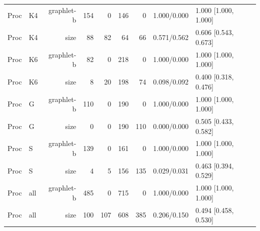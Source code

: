 \begin{tabular}{@{}llrrrrrrl@{}}
\midrule
Proc & K4 & graphlet-b & 154 & 0 & 146 & 0 & 1.000/0.000 & 1.000 [1.000, 1.000] \\
Proc & K4 & size & 88 & 82 & 64 & 66 & 0.571/0.562 & 0.606 [0.543, 0.673] \\
Proc & K6 & graphlet-b & 82 & 0 & 218 & 0 & 1.000/0.000 & 1.000 [1.000, 1.000] \\
Proc & K6 & size & 8 & 20 & 198 & 74 & 0.098/0.092 & 0.400 [0.318, 0.476] \\
Proc & G & graphlet-b & 110 & 0 & 190 & 0 & 1.000/0.000 & 1.000 [1.000, 1.000] \\
Proc & G & size & 0 & 0 & 190 & 110 & 0.000/0.000 & 0.505 [0.433, 0.582] \\
Proc & S & graphlet-b & 139 & 0 & 161 & 0 & 1.000/0.000 & 1.000 [1.000, 1.000] \\
Proc & S & size & 4 & 5 & 156 & 135 & 0.029/0.031 & 0.463 [0.394, 0.529] \\
Proc & all & graphlet-b & 485 & 0 & 715 & 0 & 1.000/0.000 & 1.000 [1.000, 1.000] \\
Proc & all & size & 100 & 107 & 608 & 385 & 0.206/0.150 & 0.494 [0.458, 0.530] \\
\bottomrule
\end{tabular}
